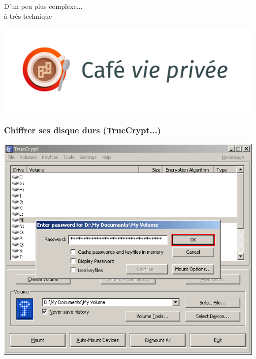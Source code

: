 \documentclass{beamer}
\begin{document}
\begin{frame}
\begin{center}
\Huge{D'un peu plus complexe...\\ à très technique}
\end{center}
\end{frame}

\begin{frame}
\begin{center}
\includegraphics[scale=0.4] {./images/LogoCafeViePrivee.jpg}
\end{center}

\end{frame}

\begin{frame}
\frametitle{Chiffrer ses disque durs (TrueCrypt...)}
\begin{center}
\includegraphics[scale=0.4] {./images/Truecrypt18.png}
\end{center}
\end{frame}
\end{document}
